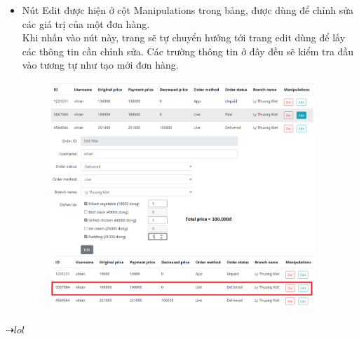 \documentclass[13pt,a4paper]{article}
\begin{document}
\begin{itemize}
		\item Nút Edit được hiện ở cột Manipulations trong bảng, được dùng để chỉnh sửa các giá trị của một đơn hàng. \\
		Khi nhấn vào nút này, trang sẽ tự chuyển hướng tới trang edit dùng để lấy các thông tin cần chỉnh sửa. Các trường thông tin ở đây đều sẽ kiểm tra đầu vào tương tự như tạo mới đơn hàng.
		\begin{figure}[h!]
			\begin{center}
				\includegraphics[width=10cm]{vitran/web_edit.png}
			\end{center}
		\end{figure}
		\newpage
	\end{itemize}
	$\dashrightarrow{lol}$
\end{document}
